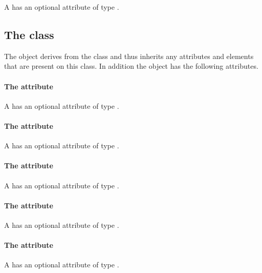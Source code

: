 A \LineEnding has an optional attribute 
of type .

\subsection{The  class}
\label{lineargradient-class}


The \LinearGradient object derives from the  class
and thus inherits any attributes and elements that are present on this
class.
In addition the \LinearGradient object has the following attributes.

\paragraph{The \fixttspace{} attribute}

A \LinearGradient has an optional attribute  of type
\RelAbsVector.

\paragraph{The \fixttspace{} attribute}

A \LinearGradient has an optional attribute  of type
\RelAbsVector.

\paragraph{The \fixttspace{} attribute}

A \LinearGradient has an optional attribute  of type
\RelAbsVector.

\paragraph{The \fixttspace{} attribute}

A \LinearGradient has an optional attribute  of type
\RelAbsVector.

\paragraph{The \fixttspace{} attribute}

A \LinearGradient has an optional attribute  of type
\RelAbsVector.


